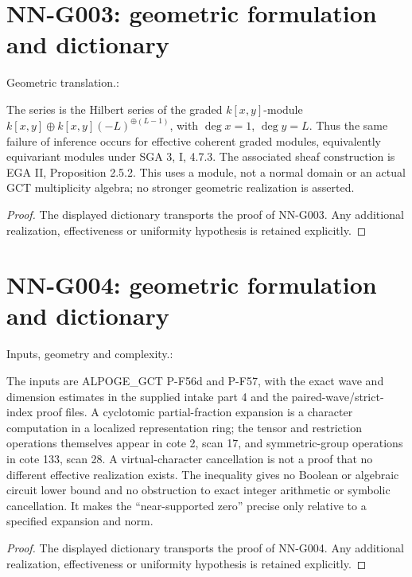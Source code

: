 \section{NN-G003: geometric formulation and dictionary}
\begin{geometricstatement}[NN-G003]
Geometric translation.:

The series is the Hilbert series of the graded
$k[x,y]$-module
$k[x,y]\oplus k[x,y](-L)^{\oplus(L-1)}$, with
$\deg x=1$, $\deg y=L$. Thus the same failure of inference occurs
for effective coherent graded modules, equivalently equivariant
modules under SGA 3, I, 4.7.3. The associated sheaf construction is
EGA II, Proposition 2.5.2. This uses a module, not a normal domain
or an actual GCT multiplicity algebra; no stronger geometric
realization is asserted.


\end{geometricstatement}
\begin{proof} The displayed dictionary transports the proof of NN-G003. Any additional realization, effectiveness or uniformity hypothesis is retained explicitly.\end{proof}


\section{NN-G004: geometric formulation and dictionary}
\begin{geometricstatement}[NN-G004]
Inputs, geometry and complexity.:

The inputs are ALPOGE\_GCT P-F56d and P-F57, with the exact wave
and dimension estimates in the supplied intake part 4 and the
paired-wave/strict-index proof files. A cyclotomic partial-fraction
expansion is a character computation in a localized representation
ring; the tensor and restriction operations themselves appear in
cote 2, scan 17, and symmetric-group operations in cote 133,
scan 28. A virtual-character cancellation is not a proof that
no different effective realization exists. The inequality gives
no Boolean or algebraic circuit lower bound and no obstruction
to exact integer arithmetic or symbolic cancellation. It makes
the ``near-supported zero'' precise only relative to a specified
expansion and norm.


\end{geometricstatement}
\begin{proof} The displayed dictionary transports the proof of NN-G004. Any additional realization, effectiveness or uniformity hypothesis is retained explicitly.\end{proof}


